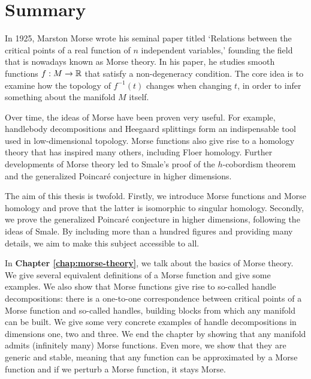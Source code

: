\chapter*{Summary}
\label{ch:summary}

\vspace*{-1cm}
In 1925, Marston Morse wrote his seminal paper titled `Relations between the critical points of a real function of $n$ independent variables,' founding the field that is nowadays known as Morse theory.
In his paper, he studies smooth functions $f:M \to  \mathbb{R}$ that satisfy a non-degeneracy condition.
The core idea is to examine how the topology of $f^{-1}(t)$ changes when changing $t$, in order to infer something about the manifold $M$ itself.

Over time, the ideas of Morse have been proven very useful.
For example, handlebody decompositions and Heegaard splittings form an indispensable tool used in low-dimensional topology.
Morse functions also give rise to a homology theory that has inspired many others, including Floer homology.
Further developments of Morse theory led to Smale's proof of the $h$-cobordism theorem and the generalized Poincaré conjecture in higher dimensions.

The aim of this thesis is twofold.
Firstly, we introduce Morse functions and Morse homology and prove that the latter is isomorphic to singular homology.
Secondly, we prove the generalized Poincaré conjecture in higher dimensions, following the ideas of Smale.
By including more than a hundred figures and providing many details, we aim to make this subject accessible to all.



\bigskip
In \textbf{Chapter \ref{chap:morse-theory}}, we talk about the basics of Morse theory.
We give several equivalent definitions of a Morse function and give some examples.
We also show that Morse functions give rise to so-called handle decompositions: there is a one-to-one correspondence between critical points of a Morse function and so-called handles, building blocks from which any manifold can be built.
We give some very concrete examples of handle decompositions in dimensions one, two and three.
We end the chapter by showing that any manifold admits (infinitely many) Morse functions.
Even more, we show that they are generic and stable, meaning that any function can be approximated by a Morse function and if we perturb a Morse function, it stays Morse.

